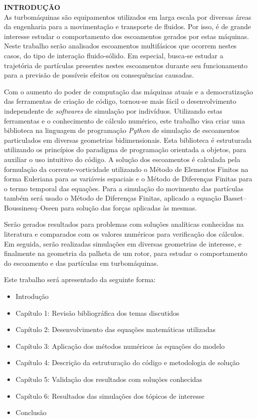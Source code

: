 \noindent\textbf{INTRODUÇÃO}
\\

As turbomáquinas são equipamentos utilizados em larga escala por diversas áreas da engenharia para a movimentação e transporte de fluidos.
Por isso, é de grande interesse estudar o comportamento dos escoamentos gerados por estas máquinas.
Neste trabalho serão analisados escoamentos multifásicos que ocorrem nestes casos, do tipo de interação fluido-sólido.
Em especial, busca-se estudar a trajetória de partículas presentes nestes escoamentos durante seu funcionamento para a previsão de possíveis efeitos ou consequências causadas.

Com o aumento do poder de computação das máquinas atuais e a democratização das ferramentas de criação de código, tornou-se mais fácil o desenvolvimento independente de \textit{softwares} de simulação por indivíduos.
Utilizando estas ferramentas e o conhecimento de cálculo numérico, este trabalho visa criar uma biblioteca na linguagem de programação \textit{Python} de simulação de escoamentos particulados em diversas geometrias bidimensionais.
Esta biblioteca é estruturada utilizando os princípios do paradigma de programação orientada a objetos, para auxiliar o uso intuitivo do código. 
A solução dos escoamentos é calculada pela formulação da corrente-vorticidade utilizando o Método de Elementos Finitos na forma Euleriana para as variáveis espaciais e o Método de Diferenças Finitas para o termo temporal das equações.
Para a simulação do movimento das partículas também será usado o Método de Diferenças Finitas, aplicado a equação Basset–Boussinesq–Oseen para solução das forças aplicadas às mesmas.

Serão gerados resultados para problemas com soluções analíticas conhecidas na literatura e comparados com os valores numéricos para verificação dos cálculos.
Em seguida, serão realizadas simulações em diversas geometrias de interesse, e finalmente na geometria da palheta de um rotor, para estudar o comportamento do escoamento e das partículas em turbomáquinas.

Este trabalho será apresentado da seguinte forma:
\begin{itemize}
	\item Introdução
	\item Capítulo 1: Revisão bibliográfica dos temas discutidos
	\item Capítulo 2: Desenvolvimento das equações matemáticas utilizadas
	\item Capítulo 3: Aplicação dos métodos numéricos às equações do modelo
	\item Capítulo 4: Descrição da estruturação do código e metodologia de solução
	\item Capítulo 5: Validação dos resultados com soluções conhecidas
	\item Capítulo 6: Resultados das simulações dos tópicos de interesse
	\item Conclusão
\end{itemize}
